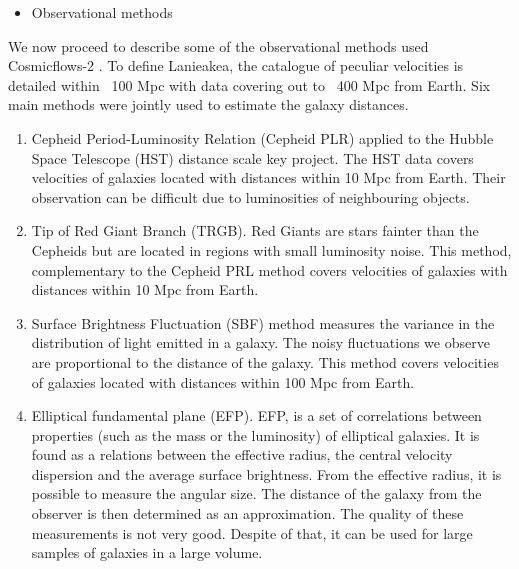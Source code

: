 \documentclass[12pt]{article}
\begin{document}
\begin{itemize}
\item Observational methods
\end{itemize}
\begin{par}
We now proceed to describe some of the observational
 methods used Cosmicflows-2
  \cite{tully_cosmicflows-2_2013}. To define Lanieakea,
   the catalogue of
   peculiar velocities is detailed within ~100 Mpc with
    data covering out to ~400 Mpc from Earth. Six main
     methods
     were jointly used to estimate the galaxy
      distances.	\\
 \begin{enumerate}
 \item Cepheid Period-Luminosity
      Relation (Cepheid PLR) applied to the Hubble
       Space Telescope (HST) distance scale key
        project. The HST data covers velocities of galaxies
         located with distances
         within 10 Mpc from Earth. Their observation can be
          difficult due to luminosities of neighbouring
           objects.\\
              
  \item Tip of Red Giant Branch (TRGB). Red Giants are
   stars 
     fainter than the Cepheids but are located in
      regions with small luminosity noise. This
       method,
       complementary to the Cepheid PRL method covers
        velocities of galaxies with 
        distances within 10 Mpc from Earth.\\
        
  \item Surface Brightness Fluctuation (SBF) method
   measures the variance in the distribution of light
    emitted in a galaxy. The noisy fluctuations we
     observe are proportional to the distance of the
      galaxy. This method covers velocities of galaxies
       located with distances within 100
       Mpc from Earth.\\
  
  \item Elliptical fundamental plane (EFP). EFP, is a
   set of correlations between properties (such as the
    mass or the luminosity) of elliptical galaxies. It
     is found as a relations between the effective
      radius, the central velocity dispersion and the
       average surface brightness. From the effective
        radius, it is possible to measure the angular
         size. The distance of the galaxy from the
          observer is then determined as an
           approximation.  
  The quality of these measurements is not very
  good. Despite of that, it can be used for large
   samples of galaxies in a large volume.\\
   

\end{enumerate}
\end{par}
\end{document}
